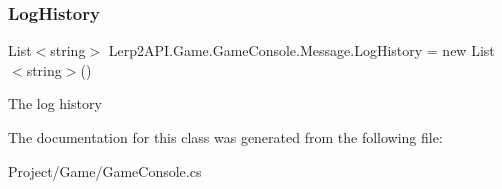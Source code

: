 \subsubsection{\texorpdfstring{Log\+History}{LogHistory}}
{\footnotesize\ttfamily List$<$string$>$ Lerp2\+A\+P\+I.\+Game.\+Game\+Console.\+Message.\+Log\+History = new List$<$string$>$()\hspace{0.3cm}{\ttfamily [static]}}



The log history 



The documentation for this class was generated from the following file\+:\begin{DoxyCompactItemize}
\item 
Project/\+Game/Game\+Console.\+cs\end{DoxyCompactItemize}

